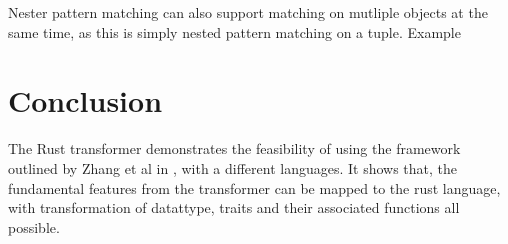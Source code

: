 \documentclass[ oneside,%
                    author={James Elgar},
                    degree={MEng},
                     title={Bidirectional transformer between functional and \\ object-oriented programming in Rust},
                  subtitle={}]{dissertation}
\newcommand{\weixin}{Zhang et al }
\begin{document}
Nester pattern matching can also support matching on mutliple objects at the same time, as this is simply nested pattern matching on a tuple. Example 







\chapter{Conclusion}
\label{chap:conclusion}

The Rust transformer demonstrates the feasibility of using the framework outlined by \weixin in \cite{food}, with a different languages. It shows that, the fundamental features from the transformer can be mapped to the rust language, with transformation of datattype, traits and their associated functions all possible. 
\end{document}
